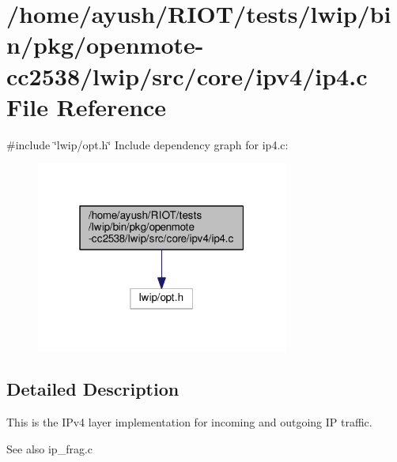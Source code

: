 \hypertarget{openmote-cc2538_2lwip_2src_2core_2ipv4_2ip4_8c}{}\section{/home/ayush/\+R\+I\+O\+T/tests/lwip/bin/pkg/openmote-\/cc2538/lwip/src/core/ipv4/ip4.c File Reference}
\label{openmote-cc2538_2lwip_2src_2core_2ipv4_2ip4_8c}
{\ttfamily \#include \char`\"{}lwip/opt.\+h\char`\"{}}\newline
Include dependency graph for ip4.\+c\+:
\nopagebreak
\begin{figure}[H]
\begin{center}
\leavevmode
\includegraphics[width=235pt]{openmote-cc2538_2lwip_2src_2core_2ipv4_2ip4_8c__incl}
\end{center}
\end{figure}


\subsection{Detailed Description}
This is the I\+Pv4 layer implementation for incoming and outgoing IP traffic.

\begin{DoxySeeAlso}{See also}
ip\+\_\+frag.\+c 
\end{DoxySeeAlso}

